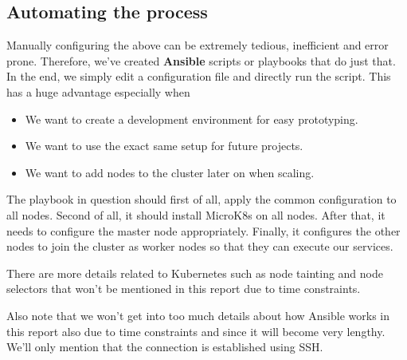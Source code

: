 \subsection{Automating the process}
Manually configuring the above can be extremely tedious, inefficient and error prone.
Therefore, we've created {\bf Ansible} scripts or playbooks that do just that. In the end, we simply edit a configuration file and directly run the script.
This has a huge advantage especially when
\begin{itemize}
    \item We want to create a development environment for easy prototyping.
    \item We want to use the exact same setup for future projects.
    \item We want to add nodes to the cluster later on when scaling.
\end{itemize}

The playbook in question should first of all, apply the common configuration to all nodes.
Second of all, it should install MicroK8s on all nodes.
After that, it needs to configure the master node appropriately.
Finally, it configures the other nodes to join the cluster as worker nodes so that they can execute our services.

There are more details related to Kubernetes such as node tainting and node selectors that won't be mentioned  in this report due to time constraints.

Also note that we won't get into too much details about how Ansible works in this report also due to time constraints and since it will become very lengthy. We'll only mention that the connection is established using SSH.

